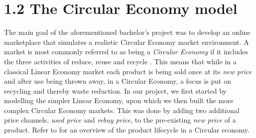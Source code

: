 
\clearpage
\section*{1.2 The Circular Economy model}\label{sec:CircularEconomy}

The main goal of the aforementioned bachelor's project was to develop an online marketplace that simulates a realistic Circular Economy market environment. A market is most commonly referred to as being a \emph{Circular Economy} if it includes the three activities of reduce, reuse and recycle \cite{circularEconomyDefinition}. This means that while in a classical Linear Economy market each product is being sold once at its \emph{new price} and after use being thrown away, in a Circular Economy, a focus is put on recycling and thereby waste reduction. In our project, we first started by modelling the simpler Linear Economy, upon which we then built the more complex Circular Economy markets. This was done by adding two additional price channels, \emph{used price} and \emph{rebuy price}, to the pre-existing \emph{new price} of a product. Refer to  for an overview of the product lifecycle in a Circular economy.

